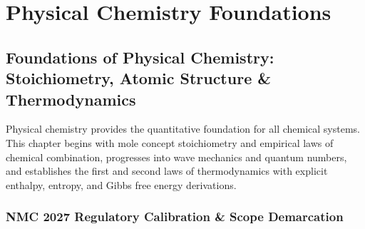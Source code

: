 \documentclass[10pt,twoside,openright]{book}
\begin{document}
\cleardoublepage

\setcounter{tocdepth}{2}
\setcounter{secnumdepth}{2}
\tableofcontents
\cleardoublepage

\mainmatter

\part{Physical Chemistry Foundations}

\chapter{Foundations of Physical Chemistry: Stoichiometry, Atomic Structure \& Thermodynamics}

Physical chemistry provides the quantitative foundation for all chemical systems. This chapter begins with mole concept stoichiometry and empirical laws of chemical combination, progresses into wave mechanics and quantum numbers, and establishes the first and second laws of thermodynamics with explicit enthalpy, entropy, and Gibbs free energy derivations.

\section{NMC 2027 Regulatory Calibration \& Scope Demarcation}
\end{document}
